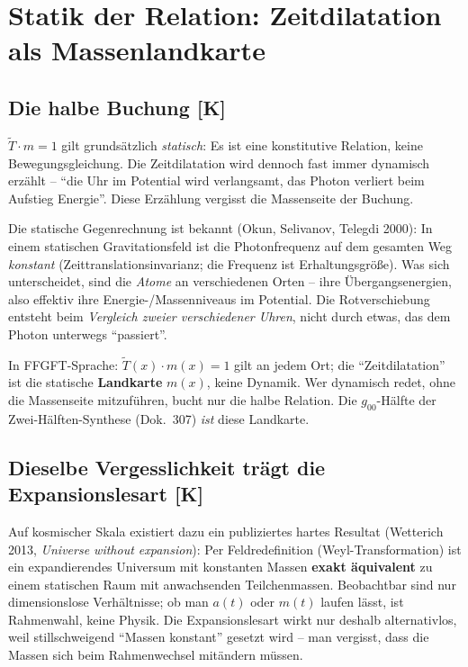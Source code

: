 \chapter{Statik der Relation: Zeitdilatation als Massenlandkarte}

\section{Die halbe Buchung [K]}

$\tilde T \cdot m = 1$ gilt grundsätzlich \emph{statisch}: Es ist
eine konstitutive Relation, keine Bewegungsgleichung. Die
Zeitdilatation wird dennoch fast immer dynamisch erzählt --
\enquote{die Uhr im Potential wird verlangsamt, das Photon verliert
beim Aufstieg Energie}. Diese Erzählung vergisst die Massenseite
der Buchung.

Die statische Gegenrechnung ist bekannt (Okun, Selivanov, Telegdi
2000): In einem statischen Gravitationsfeld ist die Photonfrequenz
auf dem gesamten Weg \emph{konstant} (Zeittranslationsinvarianz;
die Frequenz ist Erhaltungsgröße). Was sich unterscheidet, sind die
\emph{Atome} an verschiedenen Orten -- ihre Übergangsenergien, also
effektiv ihre Energie-/Massenniveaus im Potential. Die
Rotverschiebung entsteht beim \emph{Vergleich zweier verschiedener
Uhren}, nicht durch etwas, das dem Photon unterwegs
\enquote{passiert}.

In FFGFT-Sprache: $\tilde T(x)\cdot m(x) = 1$ gilt an jedem Ort;
die \enquote{Zeitdilatation} ist die statische \textbf{Landkarte}
$m(x)$, keine Dynamik. Wer dynamisch redet, ohne die Massenseite
mitzuführen, bucht nur die halbe Relation. Die $g_{00}$-Hälfte der
Zwei-Hälften-Synthese (Dok.~307) \emph{ist} diese Landkarte.

\section{Dieselbe Vergesslichkeit trägt die Expansionslesart [K]}

Auf kosmischer Skala existiert dazu ein publiziertes hartes
Resultat (Wetterich 2013, \emph{Universe without expansion}): Per
Feldredefinition (Weyl-Transformation) ist ein expandierendes
Universum mit konstanten Massen \textbf{exakt äquivalent} zu einem
statischen Raum mit anwachsenden Teilchenmassen. Beobachtbar sind
nur dimensionslose Verhältnisse; ob man $a(t)$ oder $m(t)$ laufen
lässt, ist Rahmenwahl, keine Physik. Die Expansionslesart wirkt nur
deshalb alternativlos, weil stillschweigend \enquote{Massen
konstant} gesetzt wird -- man vergisst, dass die Massen sich beim
Rahmenwechsel mitändern müssen.

